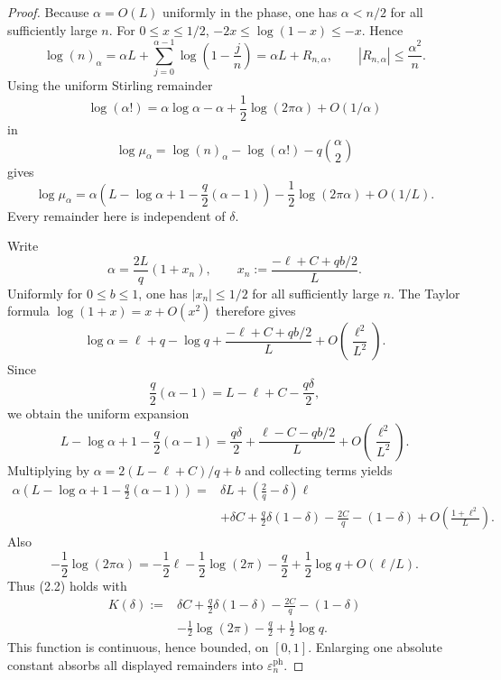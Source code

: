 \begin{proof}
Because $\alpha=O(L)$ uniformly in the phase, one has $\alpha<n/2$ for all
sufficiently large $n$. For $0\le x\le1/2$,
$-2x\le\log(1-x)\le-x$. Hence
\[
  \log(n)_\alpha
  =\alpha L+\sum_{j=0}^{\alpha-1}\log\!\left(1-\frac jn\right)
  =\alpha L+R_{n,\alpha},
  \qquad
  |R_{n,\alpha}|\le\frac{\alpha^2}{n}.
\]
Using the uniform Stirling remainder
\[
  \log(\alpha!)
  =\alpha\log\alpha-\alpha
   +\frac12\log(2\pi\alpha)+O(1/\alpha)
\]
in
\[
  \log\mu_\alpha
  =\log(n)_\alpha-\log(\alpha!)-q\binom\alpha2
\]
gives
\begin{equation*}
  \log\mu_\alpha
  =
  \alpha\left(
    L-\log\alpha+1-\frac q2(\alpha-1)
  \right)
  -\frac12\log(2\pi\alpha)
  +O(1/L).
  \tag{2.5}
\end{equation*}
Every remainder here is independent of $\delta$.

Write
\[
  \alpha=\frac{2L}{q}(1+x_n),
  \qquad
  x_n:=\frac{-\ell+C+qb/2}{L}.
\]
Uniformly for $0\le b\le1$, one has $|x_n|\le1/2$ for all sufficiently
large $n$. The Taylor formula
$\log(1+x)=x+O(x^2)$ therefore gives
\[
  \log\alpha
  =\ell+q-\log q
   +\frac{-\ell+C+qb/2}{L}
   +O\!\left(\frac{\ell^2}{L^2}\right).
\]
Since
\[
  \frac q2(\alpha-1)=L-\ell+C-\frac{q\delta}{2},
\]
we obtain the uniform expansion
\begin{equation*}
  L-\log\alpha+1-\frac q2(\alpha-1)
  =
  \frac{q\delta}{2}
  +\frac{\ell-C-qb/2}{L}
  +O\!\left(\frac{\ell^2}{L^2}\right).
  \tag{2.6}
\end{equation*}
Multiplying by
$\alpha=2(L-\ell+C)/q+b$ and collecting terms yields
\[
\begin{split}
  \alpha\left(
    L-\log\alpha+1-\frac q2(\alpha-1)
  \right)
  ={}&
  \delta L+\left(\frac2q-\delta\right)\ell\\
  &+\delta C+\frac q2\delta(1-\delta)
    -\frac{2C}{q}-(1-\delta)
    +O\!\left(\frac{1+\ell^2}{L}\right).
\end{split}
\]
Also
\[
  -\frac12\log(2\pi\alpha)
  =-\frac12\ell-\frac12\log(2\pi)-\frac q2
    +\frac12\log q+O(\ell/L).
\]
Thus (2.2) holds with
\begin{equation*}
\begin{split}
  K(\delta):={}&
  \delta C+\frac q2\delta(1-\delta)-\frac{2C}{q}-(1-\delta)\\
  &-\frac12\log(2\pi)-\frac q2+\frac12\log q.
\end{split}
  \tag{2.7}
\end{equation*}
This function is continuous, hence bounded, on $[0,1]$. Enlarging one absolute
constant absorbs all displayed remainders into
$\varepsilon_n^{\mathrm{ph}}$.


\end{proof}
